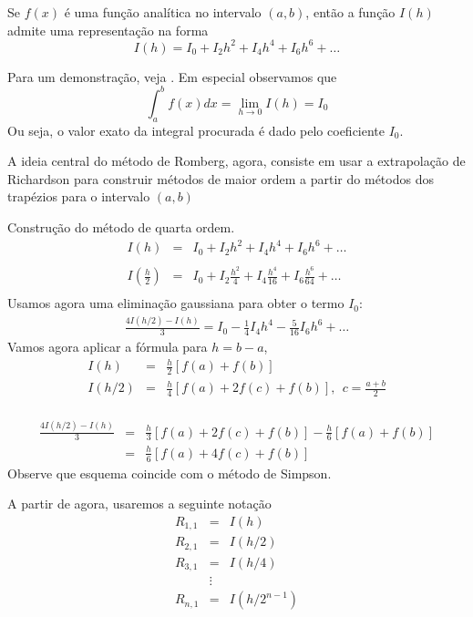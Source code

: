 \begin{teo} Se $f(x)$ é uma função analítica no intervalo $(a,b)$, então a função $I(h)$ admite uma representação na forma
$$I(h)=I_0 + I_2 h^2 + I_4{h^4}+ I_6{h^6}+\ldots$$
\end{teo}
Para um demonstração, veja \cite{DEMAILLY}. Em especial observamos que
$$\int_a^b f(x)dx = \lim_{h\to 0}I(h)=I_0$$
Ou seja, o valor exato da integral procurada é dado pelo coeficiente $I_0$.

A ideia central do método de Romberg, agora, consiste em usar a extrapolação de Richardson para construir métodos de maior ordem a partir do métodos dos trapézios para o intervalo $(a,b)$
\begin{ex} \label{exemplo_romberg_1}Construção do método de quarta ordem.
\begin{eqnarray*}
I(h)&=&I_0 + I_2 h^2 + I_4{h^4}+ I_6{h^6}+\ldots\\~\\
I\left(\frac{h}{2}\right)&=&I_0 + I_2 \frac{h^2}{4} + I_4\frac{h^4}{16}+ I_6\frac{h^6}{64}+\ldots\\
\end{eqnarray*}
Usamos agora uma eliminação gaussiana para obter o termo $I_0$:
\begin{eqnarray*}
\frac{4I(h/2)-I(h)}{3}=I_0-\frac{1}{4}I_4h^4-\frac{5}{16}I_6h^6+\ldots
\end{eqnarray*}
Vamos agora aplicar a fórmula para $h=b-a$,
\begin{eqnarray*}
I(h)&=& \frac{h}{2} \left[f(a)+f(b)\right]\\
I(h/2)&=& \frac{h}{4} \left[f(a)+2f\left(c\right)+f(b)\right],~~ c=\frac{a+b}{2}\\
\end{eqnarray*}

\begin{eqnarray*}
\frac{4I(h/2)-I(h)}{3}&=&\frac{h}{3}\left[f(a)+2f\left(c\right)+f(b)\right]-\frac{h}{6} \left[f(a)+f(b)\right]\\
&=&\frac{h}{6}\left[f(a)+4f\left(c\right)+f(b)\right]
\end{eqnarray*}
Observe que esquema coincide com o método de Simpson.
\end{ex}

A partir de agora, usaremos a seguinte notação
\begin{eqnarray*}
R_{1,1}&=&I(h)\\
R_{2,1}&=&I(h/2)\\
R_{3,1}&=&I(h/4)\\
&\vdots&\\
R_{n,1}&=&I(h/2^{n-1})
\end{eqnarray*}

